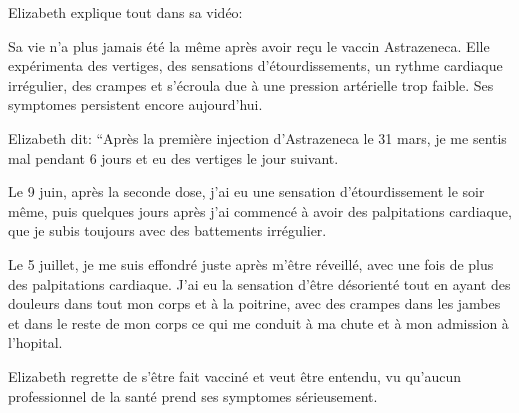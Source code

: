 Elizabeth explique tout dans sa vidéo:

Sa vie n'a plus jamais été la même après avoir reçu le vaccin Astrazeneca. Elle
expérimenta des vertiges, des sensations d'étourdissements, un rythme cardiaque
irrégulier, des crampes et s'écroula due à une pression artérielle trop
faible. Ses symptomes persistent encore aujourd'hui.

Elizabeth dit: “Après la première injection d'Astrazeneca le 31 mars, je me
sentis mal pendant 6 jours et eu des vertiges le jour suivant.

Le 9 juin, après la seconde dose, j'ai eu une sensation d'étourdissement le soir
même, puis quelques jours après j'ai commencé à avoir des palpitations
cardiaque, que je subis toujours avec des battements irrégulier.

Le 5 juillet, je me suis effondré juste après m'être réveillé, avec une fois de
plus des palpitations cardiaque. J'ai eu la sensation d'être désorienté tout en
ayant des douleurs dans tout mon corps et à la poitrine, avec des crampes dans
les jambes et dans le reste de mon corps ce qui me conduit à ma chute et à mon
admission à l'hopital.

Elizabeth regrette de s'être fait vacciné et veut être entendu, vu qu'aucun
professionnel de la santé prend ses symptomes sérieusement.
